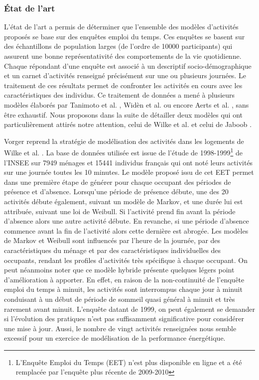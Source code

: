 \subsubsection{État de l'art}

L'état de l'art a permis de déterminer que l'ensemble des modèles d'activités proposés se base sur des enquêtes emploi du temps. Ces enquêtes se basent sur des échantillons de population larges (de l'ordre de 10000 participants) qui assurent une bonne représentativité des comportements de la vie quotidienne. Chaque répondant d'une enquête est associé à un descriptif socio-démographique et un carnet d'activités renseigné précisément sur une ou plusieurs journées. Le traitement de ces résultats permet de confronter les activités en cours avec les caractéristiques des individus. Ce traitement de données a mené à plusieurs modèles élaborés par Tanimoto et al. \cite{Tanimoto-08}, Widèn et al. \cite{Widen-12} ou encore Aerts et al. \cite{Aerts-14}, sans être exhaustif. Nous proposons dans la suite de détailler deux modèles qui ont particulièrement attirés notre attention, celui de Wilke et al. \cite{Wilke-13} et celui de Jaboob \cite{Jaboob-16}.

Vorger \cite{Vorger-14} reprend la stratégie de modélisation des activités dans les logements de Wilke et al. \cite{Wilke-2013}. La base de données utilisée est issue de l'étude de 1998-1999\footnote{L'Enquête Emploi du Temps (EET) n'est plus disponible en ligne et a été remplacée par l'enquête plus récente de 2009-2010} de l'INSEE sur 7949 ménages et 15441 individus français qui ont noté leurs activités sur une journée toutes les 10 minutes. Le modèle proposé issu de cet EET permet dans une première étape de générer pour chaque occupant des périodes de présence et d'absence. Lorsqu'une période de présence débute, une des 20 activités débute également, suivant un modèle de Markov, et une durée lui est attribuée, suivant une loi de Weibull. Si l'activité prend fin avant la période d'absence alors une autre activité débute. En revanche, si une période d'absence commence avant la fin de l'activité alors cette dernière est abrogée. Les modèles de Markov et Weibull sont influencés par l'heure de la journée, par des caractéristiques du ménage et par des caractéristiques individuelles des occupants, rendant les profiles d'activités très spécifique à chaque occupant. On peut néanmoins noter que ce modèle hybride présente quelques légers point d'amélioration à apporter. En effet, en raison de la non-continuité de l'enquête emploi du temps à minuit, les activités sont interrompus chaque jour à minuit conduisant à un début de période de sommeil quasi général à minuit et très rarement avant minuit. L'enquête datant de 1999, on peut également se demander si l'évolution des pratiques n'est pas suffisamment significative pour considérer une mise à jour. Aussi, le nombre de vingt activités renseignées nous semble excessif pour un exercice de modélisation de la performance énergétique.

